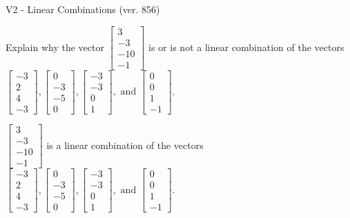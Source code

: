 \begin{exercise}
  \begin{exerciseTitle}V2 - Linear Combinations (ver. 856)\end{exerciseTitle}
  \begin{exerciseStatement}
    Explain why the vector \(\left[\begin{array}{c}
3 \\
-3 \\
-10 \\
-1
\end{array}\right]\)  is or is not a linear 
	combination of the vectors \(\left[\begin{array}{c}
-3 \\
2 \\
4 \\
-3
\end{array}\right] , \left[\begin{array}{c}
0 \\
-3 \\
-5 \\
0
\end{array}\right] , \left[\begin{array}{c}
-3 \\
-3 \\
0 \\
1
\end{array}\right] , \text{ and } \left[\begin{array}{c}
0 \\
0 \\
1 \\
-1
\end{array}\right]\).
	


  \end{exerciseStatement}
  \begin{exerciseAnswer}
   \(\left[\begin{array}{c}
3 \\
-3 \\
-10 \\
-1
\end{array}\right]\) 
  	 is  
	a linear combination of the vectors \(\left[\begin{array}{c}
-3 \\
2 \\
4 \\
-3
\end{array}\right] , \left[\begin{array}{c}
0 \\
-3 \\
-5 \\
0
\end{array}\right] , \left[\begin{array}{c}
-3 \\
-3 \\
0 \\
1
\end{array}\right] , \text{ and } \left[\begin{array}{c}
0 \\
0 \\
1 \\
-1
\end{array}\right]\).


\end{exerciseAnswer}
\end{exercise}

